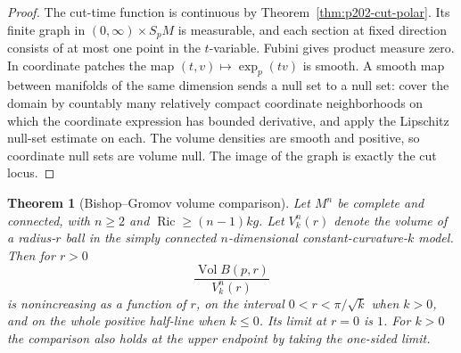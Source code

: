 \documentclass[11pt,oneside,openany]{book}
\theoremstyle{plain}
\newtheorem{theorem}{Theorem}[chapter]
\theoremstyle{definition}
\theoremstyle{remark}
\begin{document}
\begin{proof}
The cut-time function is continuous by
Theorem~\ref{thm:p202-cut-polar}. Its finite graph in
\((0,\infty)\times S_pM\) is measurable, and each section
at fixed direction consists of at most one point in the
\(t\)-variable. Fubini gives product measure zero. In coordinate
patches the map \((t,v)\mapsto\exp_p(tv)\) is smooth. A smooth
map between manifolds of the same dimension sends a null set
to a null set: cover the domain by countably many relatively
compact coordinate neighborhoods on which the coordinate
expression has bounded derivative, and apply the Lipschitz
null-set estimate on each. The volume densities are smooth
and positive, so coordinate null sets are volume null.
The image of the graph is exactly the cut locus.
\end{proof}

\begin{theorem}[Bishop--Gromov volume comparison]
\label{thm:p202-bishop-gromov}
Let \(M^n\) be complete and connected, with \(n\ge2\) and
\(\operatorname{Ric}\ge(n-1)k g\). Let \(V_k^n(r)\) denote
the volume of a radius-\(r\) ball in the simply connected
\(n\)-dimensional constant-curvature-\(k\) model. Then for
\(r>0\)
\[
 \frac{\operatorname{Vol} B(p,r)}{V_k^n(r)}
\]
is nonincreasing as a function of \(r\), on the interval
\(0<r<\pi/\sqrt{k}\) when \(k>0\), and on the whole positive
half-line when \(k\le0\). Its limit at \(r=0\) is \(1\).
For \(k>0\) the comparison also holds at the upper endpoint
by taking the one-sided limit.
\end{theorem}
\end{document}
